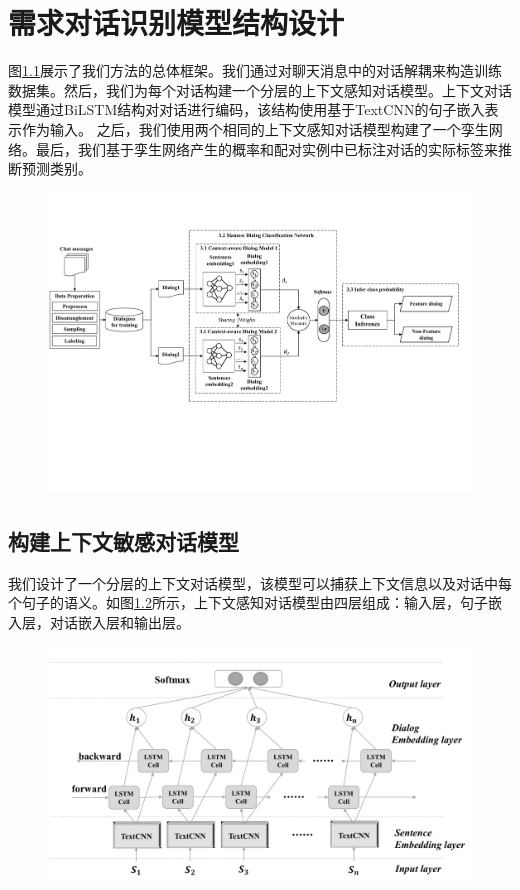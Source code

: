 \chapter{需求对话识别模型结构设计}
图\ref{fig:approach}展示了我们方法的总体框架。我们通过对聊天消息中的对话解耦来构造训练数据集。然后，我们为每个对话构建一个分层的上下文感知对话模型。上下文对话模型通过BiLSTM结构对对话进行编码，该结构使用基于TextCNN的句子嵌入表示作为输入。 之后，我们使用两个相同的上下文感知对话模型构建了一个孪生网络。最后，我们基于孪生网络产生的概率和配对实例中已标注对话的实际标签来推断预测类别。
\begin{figure}[htbp]
    \centering
    \includegraphics[width=\textwidth]{Img/approach.pdf}
    \label{fig:approach}
\end{figure}

\section{构建上下文敏感对话模型}
我们设计了一个分层的上下文对话模型，该模型可以捕获上下文信息以及对话中每个句子的语义。如图\ref{fig:model}所示，上下文感知对话模型由四层组成：输入层，句子嵌入层，对话嵌入层和输出层。
\begin{figure}[htbp]
    \centering
    \includegraphics[width=\textwidth]{Img/model.pdf}
    \label{fig:model}
\end{figure}

